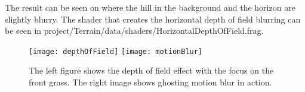       

The result can be seen on  where the hill in
the background and the horizon are slightly blurry. The shader that
creates the horizontal depth of field blurring can be seen in
project/Terrain/data/shaders/HorizontalDepthOfField.frag.

\begin{figure}
  \label{fig:dofMotionBlur}
  \centering
  \texttt{[image: depthOfField]}
  \texttt{[image: motionBlur]}
  \caption{The left figure shows the depth of field effect with the
    focus on the front grass. The right image shows ghosting motion
    blur in action.}
\end{figure}



